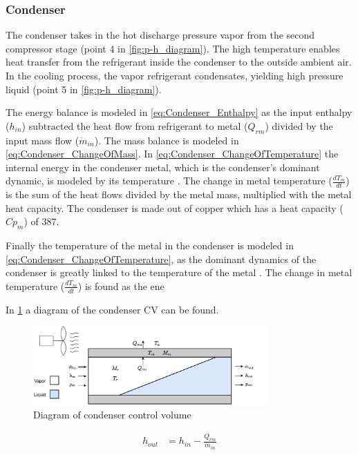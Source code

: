 \subsubsection{Condenser}
The condenser takes in the hot discharge pressure vapor from the second compressor stage (point 4 in \cref{fig:p-h_diagram}). The high temperature enables heat transfer from the refrigerant inside the condenser to the outside ambient air. In the cooling process, the vapor refrigerant condensates, yielding high pressure liquid (point 5 in \cref{fig:p-h_diagram}).

The energy balance is modeled in \cref{eq:Condenser_Enthalpy} as the input enthalpy ($h_{in}$) subtracted the heat flow from refrigerant to metal ($Q_{rm}$) divided by the input mass flow ($\dot{m}_{in}$). The mass balance is modeled in \cref{eq:Condenser_ChangeOfMass}. In \cref{eq:Condenser_ChangeOfTemperature} the internal energy in the condenser metal, which is the condenser's dominant dynamic, is modeled by its temperature \cite{Sorensen2013}. The change in metal temperature ($\frac{dT_m}{dt}$) is the sum of the heat flows divided by the metal mass, multiplied with the metal heat capacity. The condenser is made out of copper which has a heat capacity ($Cp_m$) of $387$.

Finally the temperature of the metal in the condenser is modeled in
\cref{eq:Condenser_ChangeOfTemperature}, as the dominant dynamics of the condenser is greatly linked to the temperature of the metal \cite{Sorensen2013}. The change in metal temperature ($\frac{dT_m}{dt}$) is found as the ene

In \cref{fig:condenser_CV} a diagram of the condenser CV can be found.

\begin{figure}[h!]
	\centering
	\includegraphics[width=0.8\textwidth]{Graphics/Condenser.pdf}
	\caption{Diagram of condenser control volume}
	\label{fig:condenser_CV}
\end{figure}

\begin{align}
	h_{out} 			& = h_{in} - \frac{Q_{rm}}{\dot{m}_{in}}  	\label{eq:Condenser_Enthalpy}
\end{align}

